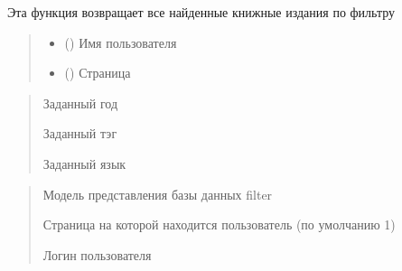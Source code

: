 \documentclass[letterpaper,10pt,russian]{sphinxmanual}
\begin{document}
\begin{fulllineitems}
\label{\detokenize{blueprints:blueprints.search_filter.filter}}
\pysigstartsignatures
{}
\pysigstopsignatures
\sphinxAtStartPar
Эта функция возвращает все найденные книжные издания по фильтру
\begin{quote}\begin{description}
\begin{itemize}
\item {} 
\sphinxAtStartPar
{} () \textendash{} Имя пользователя

\item {} 
\sphinxAtStartPar
{} () \textendash{} Страница

\end{itemize}

\end{description}\end{quote}
\begin{description}
\begin{quote}\begin{description}
\sphinxAtStartPar
Заданный год

\sphinxAtStartPar
Заданный тэг

\sphinxAtStartPar
Заданный язык

\end{description}\end{quote}

\begin{quote}\begin{description}
\sphinxAtStartPar
Модель представления базы данных filter

\sphinxAtStartPar
Страница на которой находится пользователь (по умолчанию 1)

\sphinxAtStartPar
Логин пользователя


\end{description}
\end{quote}
\end{description}
\end{fulllineitems}
\end{document}
